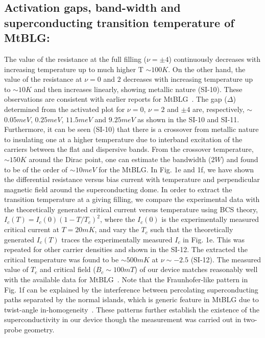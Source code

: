 \documentclass{nature}
\begin{document}
\subsection{Activation gaps, band-width and superconducting transition temperature of MtBLG:}
The value of the resistance at the full filling ($\nu=\pm 4$) continuously decreases with increasing temperature up to much higher T $\sim 100K$. %
On the other hand, the value of the resistance at $\nu=0$ and $2$ decreases with increasing temperature up to $\sim 10 K$ and then increases linearly, showing metallic nature (SI-10). These observations are consistent with earlier reports for MtBLG~\cite{cao2018correlated,yankowitz2019tuning,wu2021chern,saito2020independent,lu2019superconductors,cao2018unconventional,arora2020superconductivity,park_tunable_2021}. %
The gap ($\Delta$) determined from the activated plot for  $\nu=0$, $\nu=2$ and $\pm4$ are, respectively, $\sim$ $0.05meV$, $0.25meV$, $11.5 meV$ and  $9.25meV$ as shown in the SI-10 and SI-11. Furthermore, it can be seen (SI-10) that there is a crossover from metallic nature to insulating one at a higher temperature due to interband excitation of the carriers between the flat and dispersive bands. From the crossover temperature, $\sim 150K$ around the Dirac point, one can estimate the bandwidth ($2W$) and found to be of the order of $\sim 10 meV$ for the MtBLG. In Fig. 1e and 1f, we have shown the differential resistance versus bias current with temperature and perpendicular magnetic field around the superconducting dome. In order to extract the transition temperature at a giving filling, we compare the experimental data with the theoretically generated critical current versus temperature using BCS theory, $I_{c}(T) = I_{c}(0)(1-T/T_{c})^{2}$, where the $I_{c}(0)$ is the experimentally measured critical current at $T = 20mK$, and vary the $T_c$ such that the theoretically generated $I_{c}(T)$ traces the experimentally measured $I_{c}$ in Fig. 1e. This was repeated for other carrier densities and shown in the SI-12. The extracted the critical temperature was found to be $\sim 500mK$ at $\nu \sim -2.5$ (SI-12). The measured value of $T_c$ and critical field ($B_{c} \sim 100mT$) of our device matches reasonably well with the available data for MtBLG~\cite{cao2018unconventional,yankowitz2019tuning,lu2019superconductors,arora2020superconductivity,saito2020independent,park_tunable_2021}. 
Note that the Fraunhofer-like pattern in Fig. 1f can be explained by the interference between percolating superconducting paths separated by the normal islands, which is generic feature in MtBLG due to twist-angle in-homogeneity~\cite{zondiner2020cascade,uri_mapping_2020,park_tunable_2021}. These patterns further establish the existence of the superconductivity in our device though the measurement was carried out in two-probe geometry.
\end{document}
